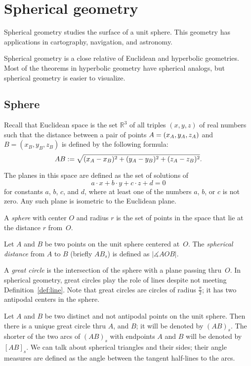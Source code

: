 \chapter{Spherical geometry}
\label{chap:sphere}

Spherical geometry studies the surface of a unit sphere.
This geometry has applications in cartography, navigation, and astronomy.

Spherical geometry is a close relative of Euclidean and hyperbolic geometries.
Most of the theorems in hyperbolic geometry have spherical analogs,
but spherical geometry is easier to visualize. 

\section{Sphere}

Recall that Euclidean space is the set $\mathbb{R}^3$ of all triples $(x,y,z)$ of real numbers
such that the distance between a pair of points
$A=(x_A,y_A,z_A)$ and $B=(x_B,y_B,z_B)$
is defined by the following formula:
$$AB
:=
\sqrt{(x_A-x_B)^2+(y_A-y_B)^2+(z_A-z_B)^2}.$$

The planes in this space are defined as the set of solutions of 
$$a\cdot x+b\cdot y+c\cdot z+d=0$$ 
for constants $a$, $b$, $c$, and $d$, where at least one of the numbers $a$, $b$, or $c$ is not zero.
Any such plane is isometric to the Euclidean plane.

A \emph{sphere} with center $O$ and radius $r$ is the set of points in the space that lie at the distance $r$ from~$O$.

Let $A$ and $B$ be two points on the unit sphere centered at~$O$.
The \emph{spherical distance} from $A$ to $B$
(briefly $AB_s$)
 is defined as  $|\measuredangle AOB|$. 

A \emph{great circle} is the intersection of the sphere with a plane passing thru~$O$.
In spherical geometry, great circles play the role of lines despite not meeting Definition~\ref{def:line}.
Note that great circles are circles of radius $\tfrac\pi2$;
it has two antipodal centers in the sphere.

Let $A$ and $B$ be two distinct and not antipodal points on the unit sphere.
Then there is a unique great circle thru $A$, and $B$;
it will be denoted by $(AB)_s$.
The shorter of the two arcs of $(AB)_s$ with endpoints $A$ and $B$ will be denoted by $[AB]_s$.
We can talk about spherical triangles and their sides;
their angle measures are defined as the angle between the tangent half-lines to the arcs.

